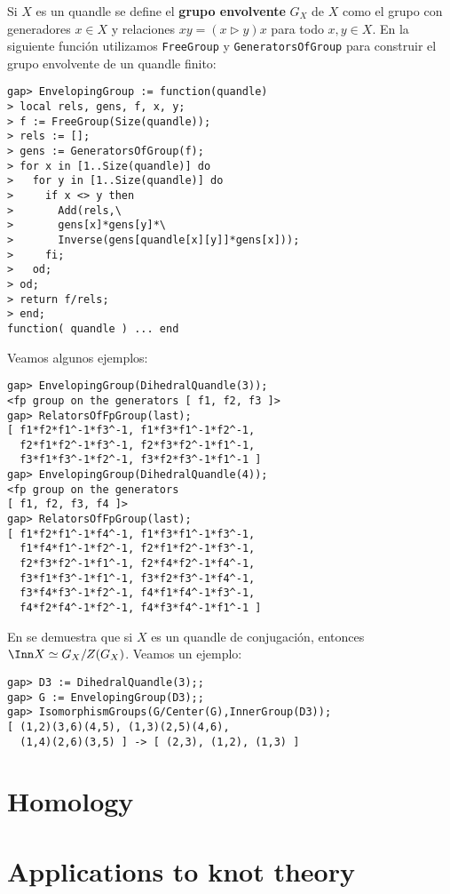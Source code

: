 \begin{block}
Si $X$ es un quandle se define el \textbf{grupo envolvente} $G_X$ de $X$ como
el grupo con generadores $x\in X$ y relaciones $xy=(x\triangleright y)x$ para
todo $x,y\in X$. En la siguiente función utilizamos \lstinline{FreeGroup} y
\lstinline{GeneratorsOfGroup} para construir el grupo envolvente de un quandle
finito:
\begin{lstlisting}
gap> EnvelopingGroup := function(quandle)
> local rels, gens, f, x, y;
> f := FreeGroup(Size(quandle));
> rels := [];
> gens := GeneratorsOfGroup(f);
> for x in [1..Size(quandle)] do
>   for y in [1..Size(quandle)] do
>     if x <> y then
>       Add(rels,\
>       gens[x]*gens[y]*\
>       Inverse(gens[quandle[x][y]]*gens[x]));
>     fi;
>   od;
> od;
> return f/rels;
> end;
function( quandle ) ... end
\end{lstlisting}
Veamos algunos ejemplos:
\begin{lstlisting}
gap> EnvelopingGroup(DihedralQuandle(3));
<fp group on the generators [ f1, f2, f3 ]>
gap> RelatorsOfFpGroup(last);
[ f1*f2*f1^-1*f3^-1, f1*f3*f1^-1*f2^-1, 
  f2*f1*f2^-1*f3^-1, f2*f3*f2^-1*f1^-1, 
  f3*f1*f3^-1*f2^-1, f3*f2*f3^-1*f1^-1 ]
gap> EnvelopingGroup(DihedralQuandle(4));
<fp group on the generators 
[ f1, f2, f3, f4 ]>
gap> RelatorsOfFpGroup(last);
[ f1*f2*f1^-1*f4^-1, f1*f3*f1^-1*f3^-1, 
  f1*f4*f1^-1*f2^-1, f2*f1*f2^-1*f3^-1, 
  f2*f3*f2^-1*f1^-1, f2*f4*f2^-1*f4^-1, 
  f3*f1*f3^-1*f1^-1, f3*f2*f3^-1*f4^-1, 
  f3*f4*f3^-1*f2^-1, f4*f1*f4^-1*f3^-1, 
  f4*f2*f4^-1*f2^-1, f4*f3*f4^-1*f1^-1 ]
\end{lstlisting}
\end{block}

\begin{block}
En \cite[Lemma 1.9]{MR1994219} se demuestra que si $X$ es un quandle de
conjugación, entonces $\Inn X\simeq G_X/Z(G_X)$. Veamos un ejemplo:
\begin{lstlisting}
gap> D3 := DihedralQuandle(3);;
gap> G := EnvelopingGroup(D3);;
gap> IsomorphismGroups(G/Center(G),InnerGroup(D3));
[ (1,2)(3,6)(4,5), (1,3)(2,5)(4,6), 
  (1,4)(2,6)(3,5) ] -> [ (2,3), (1,2), (1,3) ]
\end{lstlisting}
\end{block}


\section{Homology}
\section{Applications to knot theory}
